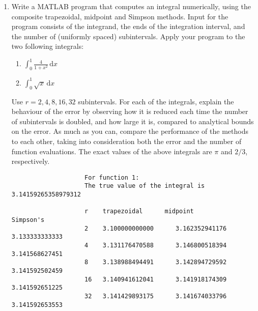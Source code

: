 \documentclass{article}
\begin{document}
\begin{enumerate}[label = {\arabic*}]
		\pagebreak
		
		\item Write a MATLAB program that computes an integral numerically, using the composite trapezoidal, midpoint and Simpson methods. Input for the program consists of the integrand, the ends of the integration interval, and the number of (uniformly spaced) subintervals. Apply your program to the two following integrals:
		\begin{enumerate}
			\item $\int_{0}^{1} \frac{4}{1 + x^2} \, \mathrm{d}x$
			\item $\int_{0}^{1} \sqrt{x} \, \mathrm{d}x$
		\end{enumerate}
		
		Use $r = 2, 4, 8, 16, 32$ subintervals. For each of the integrals, explain the behaviour of the error by observing how it is reduced each time the number of subintervals is doubled, and how large it is, compared to analytical bounds on the error. As much as you can, compare the performance of the methods to each other, taking into consideration both the error and the number of function evaluations. The exact values of the above integrals are $\pi$ and $2/3$, respectively.
		
		
		
		\pagebreak
		
		
		
		\pagebreak
		
		\begin{multicols}{2}
			\color{lightgray}
			\begin{scriptsize}
				\begin{verbatim}
					For function 1:
					The true value of the integral is 3.14159265358979312
					
					r    trapezoidal      midpoint         Simpson's
					2    3.100000000000 	 3.162352941176 	 3.133333333333 
					4    3.131176470588 	 3.146800518394 	 3.141568627451 
					8    3.138988494491 	 3.142894729592 	 3.141592502459 
					16 	 3.140941612041 	 3.141918174309 	 3.141592651225 
					32 	 3.141429893175 	 3.141674033796 	 3.141592653553 
					

\end{verbatim}
\end{scriptsize}
\end{multicols}
\end{enumerate}
\end{document}
